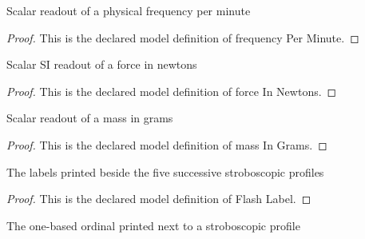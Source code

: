 \begin{definition}
  \label{def:physics:phyx-mini-0166:phyxminiproblems-problemphyxmini0166-frequencyperminute}
  Scalar readout of a physical frequency per minute
\end{definition}
\begin{proof}
  This is the declared model definition of frequency Per Minute.
\end{proof}
\begin{definition}
  \label{def:physics:phyx-mini-0166:phyxminiproblems-problemphyxmini0166-forceinnewtons}
  Scalar SI readout of a force in newtons
\end{definition}
\begin{proof}
  This is the declared model definition of force In Newtons.
\end{proof}
\begin{definition}
  \label{def:physics:phyx-mini-0166:phyxminiproblems-problemphyxmini0166-massingrams}
  Scalar readout of a mass in grams
\end{definition}
\begin{proof}
  This is the declared model definition of mass In Grams.
\end{proof}
\begin{definition}
  \label{def:physics:phyx-mini-0166:phyxminiproblems-problemphyxmini0166-flashlabel}
  The labels printed beside the five successive stroboscopic profiles
\end{definition}
\begin{proof}
  This is the declared model definition of Flash Label.
\end{proof}
\begin{definition}[ordinal]
  \label{def:physics:phyx-mini-0166:phyxminiproblems-problemphyxmini0166-flashlabel-ordinal}
  The one-based ordinal printed next to a stroboscopic profile
\end{definition}
